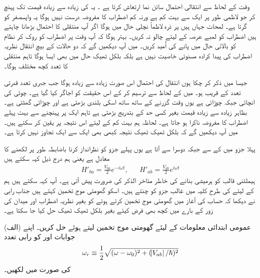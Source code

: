 وقت کے لحاظ سے انتقالی احتمال سائن نما ارتعاش کرتا ہے ۔ یہ  کی زیادہ سے زیادہ قیمت تک پہنچ کر جو لاظمی طور پر ایک سے بہت کم ہے ورنہ کم اضطراب کا مفروضہ درست نہیں ہوگا یہ واپسصفر کو گرتا ہے۔ لمحات  جہاں  ہیں پر ذرہ لاظماً نچلی حال میں ہوگا اگر آپ منتقلی کا احتمال بڑھانا چاہتے ہیں اضطراب کو لمبے عرصہ کے لیئے چالو نہ کریں۔ بہتر ہوگا کہ آپ وقت  پر اضطراب کو روک کر نظام کو بالائی حال میں پانے کی اُمید کریں۔  میں آپ دیکھیں گے کہ دو حالات کے بیچ انتقال نظریہ اضطراب کی پیدا کرادہ  مسنوئی خاصیت  نہیں ہے بلکہ بلکل ٹھیک حال میں بھی ایسا ہوگا تاہم منتقلی کا تعدد کچھ مختلف ہوگا۔

جیسا میں ذکر کر چکا ہوں انتقال کی احتمال اس صورت زیادہ سے زیادہ ہوگا جب جبری تعدد قدرتی تعدد  کے قریب ہو۔  میں  کے لحاظ سے  ترسیم کر کے اس حقیقت کو اجاگر کیا گیا ہے۔ چوٹی کی انچائی  جبکہ چوڑائی  ہے یوں وقت گزرنے کے ساتھ ساتھ اسکی بلندی بڑھتی ہے اور چوڑائی گھٹتی ہے۔ بظاہر زیادہ سے زیادہ قیمت بغیر کسی حد کے بتدریج بڑھتی ہے تاہم ایک پر پہنچنے سے بہت پہلے اضطراب کا مفروضہ ناکرا ہو جاتا ہے۔ لحاظہ ہم بہت کم  کے لیئے اس نتیجہ پر یقین کر سکتے ہیں۔  میں آپ دیکھیں گے کہ بلکل ٹھیک ٹھیک نتیجہ کبھی بھی ایک سے ایک تجاوز نہیں کرتا ہے۔

پہلا جزو  میں  کے  سے جبکہ دوسرا  سے آتا ہے یوں پہلے جزو کو  نظرانداز کرنا باضابطہ طور پر  لکھنے کا معادل ہے یعنی ہم درج ذیل کہہ سکتے ہیں
\begin{align}
	H'_{ba}=\frac{V_{ba}}{2}e^{-i\omega t},&&H'_{ab}=\frac{V_{ab}}{2}e^{i\omega t}
\end{align}
ہیملٹنی قالب کو ہرمیشی بنانے کی خاطر مئاخر الذکر کی ضرورت پیش آتی ہے۔ آپ کہہ سکتے ہیں ہم  کے لیئے  کی طرح کلیہ میں غالب جزو کو چنتے ہیں۔ اسکو گھومتی موج تخمین کہتے ہیں جناب رابی نے دیکھا کہ حساب کی آغاز میں گھومتی موج تخمین کرتے ہوئے  کو بغیر نظریہ اضطراب اور میدان کی زور کے بارے میں کچھ بھی فرض کیئے بغیر بلکل ٹھیک ٹھیک حل کیا جا سکتا ہے۔

(الف) عمومی ابتدائی معلومات  کے لیئے گھومتی موج تخمین  لیتے ہوئے  حل کریں۔ اپنے جوابات  اور  کو رابی تعدد 
\begin{align}
	\omega_r\equiv\frac{1}{2}\sqrt{(\omega-\omega_0)^2+(\abs{V_{ab}}/\hslash)^2}
\end{align}
کی صورت میں لکھیں۔

